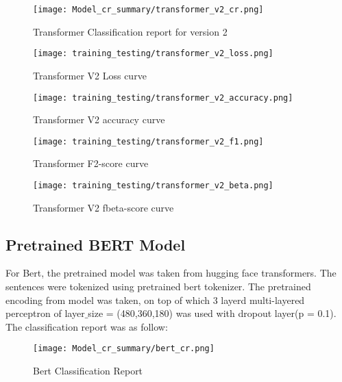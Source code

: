 \begin{figure}[H]
    \centering
    \texttt{[image: Model\_cr\_summary/transformer\_v2\_cr.png]}
    \caption{Transformer Classification report for version 2}
    \label{fig:Transformer Classification report for version 2}
\end{figure}

\begin{figure}[H]
    \centering
    \texttt{[image: training\_testing/transformer\_v2\_loss.png]}
    \caption{Transformer V2 Loss curve}
    \label{fig:Transformer V2 loss curve}
\end{figure}

\begin{figure}[H]
    \centering
    \texttt{[image: training\_testing/transformer\_v2\_accuracy.png]}
    \caption{Transformer V2 accuracy curve}
    \label{fig:Transformer V2 accuracy curve}
\end{figure}

\begin{figure}[H]
    \centering
    \texttt{[image: training\_testing/transformer\_v2\_f1.png]}
    \caption{Transformer F2-score curve}
    \label{fig:Transformer F2-score curve}
\end{figure}

\begin{figure}[H]
    \centering
    \texttt{[image: training\_testing/transformer\_v2\_beta.png]}
    \caption{Transformer V2 fbeta-score curve}
    \label{fig:Transformer V2 fbeta-score curve}
\end{figure}

\subsection{Pretrained BERT Model}
For Bert, the pretrained model was taken from hugging face transformers. The sentences were tokenized using pretrained bert tokenizer.
The pretrained encoding from model was taken, on top of which 3 layerd 
multi-layered 
perceptron of layer$\_$size 
= (480,360,180) 
was used with dropout layer(p = 0.1). The classification report was as follow:

\begin{figure}[H]
    \centering
    \texttt{[image: Model\_cr\_summary/bert\_cr.png]}
    \caption{Bert Classification Report}
    \label{fig:Bert Model Classification Report}
\end{figure}


